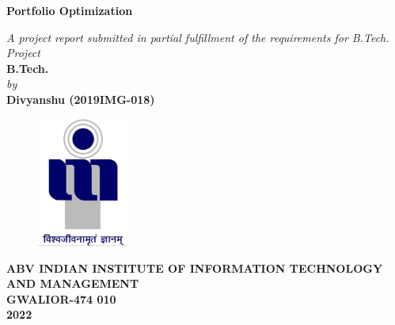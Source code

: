 \title{}
\author{}
\thispagestyle{empty}

\begin{titlepage}
\begin{center}
{\LARGE \bf Portfolio Optimization} \\
\end{center}
\begin{center}
\vspace{0.6in}
{\large \it A project report submitted in partial fulfillment of the requirements for B.Tech. Project} \\
\vspace{0.6in}
{\large \bf B.Tech.} \\
\vspace{0.5in}
{\large \it by\\}
\vspace{0.3in}
{\large \bf Divyanshu (2019IMG-018)}\\
\end {center}
\vspace{0.8in}
\begin{figure}[h]
\centerline{\includegraphics[width=1.2in]{iiitm}}
\end{figure}
\begin{center}
{\Large \bf ABV INDIAN INSTITUTE OF INFORMATION TECHNOLOGY AND MANAGEMENT\\
GWALIOR-474 010\\}
\vspace{0.2in}
{\Large \bf 2022\\}
\end{center}
\end{titlepage}
